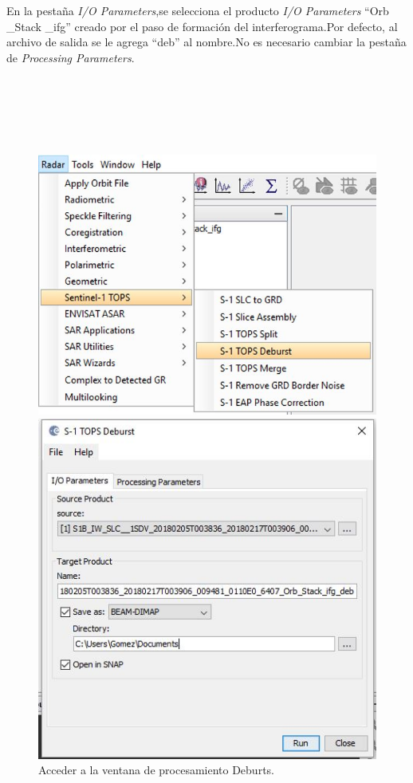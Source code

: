 \documentclass{article}
\begin{document}
    En la pestaña \textit{I/O Parameters},se selecciona el producto \textit{I/O Parameters} “Orb \_Stack \_ifg” creado por el paso de formación del interferograma.Por defecto, al archivo de salida se le agrega “deb” al nombre.No es necesario cambiar la pestaña de \textit{Processing Parameters}.\\ \\ \\ \\ \\ \\
\begin{figure}[htbp]
\begin{minipage}[b]{0.5\linewidth}
\centering
\includegraphics[width=\linewidth]{Imagen/08.JPG}
\caption{Acceder a la ventana de procesamiento Deburts.}
\label{fig:figura8}
\end{minipage}
\hspace{0.5cm}
\begin{minipage}[b]{0.5\linewidth}
\centering
\includegraphics[width=\linewidth]{Imagen/09.JPG}

\end{minipage}
\end{figure}
\end{document}
